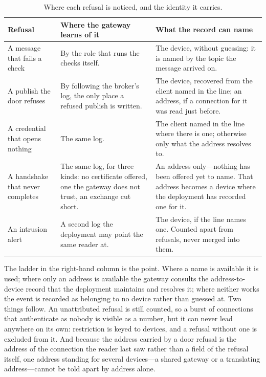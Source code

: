 \documentclass[12pt,a4paper]{report}
\begin{document}
\begin{table}[htbp]
\centering
{\small
\begin{tabularx}{\textwidth}{@{}p{3.3cm}Yp{4.4cm}@{}}
\toprule
\textbf{Refusal} & \textbf{Where the gateway learns of it}
    & \textbf{What the record can name} \\
\midrule
A message that fails a check &
By the role that runs the checks itself. &
The device, without guessing: it is named by the topic the message
arrived on. \\
\midrule
A publish the door refuses &
By following the broker's log, the only place a refused publish is
written. &
The device, recovered from the client named in the line; an address, if
a connection for it was read just before. \\
\midrule
A credential that opens nothing &
The same log. &
The client named in the line where there is one; otherwise only what
the address resolves to. \\
\midrule
A handshake that never completes &
The same log, for three kinds: no certificate offered, one the gateway
does not trust, an exchange cut short. &
An address only---nothing has been offered yet to name. That address
becomes a device where the deployment has recorded one for it. \\
\midrule
An intrusion alert &
A second log the deployment may point the same reader at. &
The device, if the line names one. Counted apart from refusals, never
merged into them. \\
\bottomrule
\end{tabularx}}
\caption{Where each refusal is noticed, and the identity it carries.}
\label{tab:gw-refusals}
\end{table}

The ladder in the right-hand column is the point. Where a name is
available it is used; where only an address is available the gateway
consults the address-to-device record that the deployment maintains and
resolves it; where neither works the event is recorded as belonging to
no device rather than guessed at. Two things follow. An unattributed
refusal is still counted, so a burst of connections that authenticate
as nobody is visible as a number, but it can never lead anywhere on
its own: restriction is keyed to devices, and a refusal without one is
excluded from it. And because the address carried by a door refusal is
the address of the connection the reader last saw rather than a field
of the refusal itself, one address standing for several devices---a
shared gateway or a translating address---cannot be told apart by
address alone.
\end{document}
